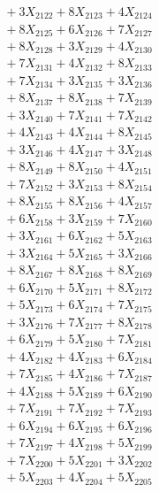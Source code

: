 \documentclass[a4paper,10pt]{article}
\begin{document}
{\begin{align}
&\;  + 3 X_{2122} + 8 X_{2123} + 4 X_{2124} \\[0.3ex]
&\;  + 8 X_{2125} + 6 X_{2126} + 7 X_{2127} \\[0.3ex]
&\;  + 8 X_{2128} + 3 X_{2129} + 4 X_{2130} \\[0.3ex]
&\;  + 7 X_{2131} + 4 X_{2132} + 8 X_{2133} \\[0.3ex]
&\;  + 7 X_{2134} + 3 X_{2135} + 3 X_{2136} \\[0.3ex]
&\;  + 8 X_{2137} + 8 X_{2138} + 7 X_{2139} \\[0.5ex]\allowbreak
&\;  + 3 X_{2140} + 7 X_{2141} + 7 X_{2142} \\[0.3ex]
&\;  + 4 X_{2143} + 4 X_{2144} + 8 X_{2145} \\[0.3ex]
&\;  + 3 X_{2146} + 4 X_{2147} + 3 X_{2148} \\[0.3ex]
&\;  + 8 X_{2149} + 8 X_{2150} + 4 X_{2151} \\[0.3ex]
&\;  + 7 X_{2152} + 3 X_{2153} + 8 X_{2154} \\[0.3ex]
&\;  + 8 X_{2155} + 8 X_{2156} + 4 X_{2157} \\[0.3ex]
&\;  + 6 X_{2158} + 3 X_{2159} + 7 X_{2160} \\[0.3ex]
&\;  + 3 X_{2161} + 6 X_{2162} + 5 X_{2163} \\[0.3ex]
&\;  + 3 X_{2164} + 5 X_{2165} + 3 X_{2166} \\[0.3ex]
&\;  + 8 X_{2167} + 8 X_{2168} + 8 X_{2169} \\[0.5ex]\allowbreak
&\;  + 6 X_{2170} + 5 X_{2171} + 8 X_{2172} \\[0.3ex]
&\;  + 5 X_{2173} + 6 X_{2174} + 7 X_{2175} \\[0.3ex]
&\;  + 3 X_{2176} + 7 X_{2177} + 8 X_{2178} \\[0.3ex]
&\;  + 6 X_{2179} + 5 X_{2180} + 7 X_{2181} \\[0.3ex]
&\;  + 4 X_{2182} + 4 X_{2183} + 6 X_{2184} \\[0.3ex]
&\;  + 7 X_{2185} + 4 X_{2186} + 7 X_{2187} \\[0.3ex]
&\;  + 4 X_{2188} + 5 X_{2189} + 6 X_{2190} \\[0.3ex]
&\;  + 7 X_{2191} + 7 X_{2192} + 7 X_{2193} \\[0.3ex]
&\;  + 6 X_{2194} + 6 X_{2195} + 6 X_{2196} \\[0.3ex]
&\;  + 7 X_{2197} + 4 X_{2198} + 5 X_{2199} \\[0.5ex]\allowbreak
&\;  + 7 X_{2200} + 5 X_{2201} + 3 X_{2202} \\[0.3ex]
&\;  + 5 X_{2203} + 4 X_{2204} + 5 X_{2205} \\[0.3ex]

\end{align}}
\end{document}
